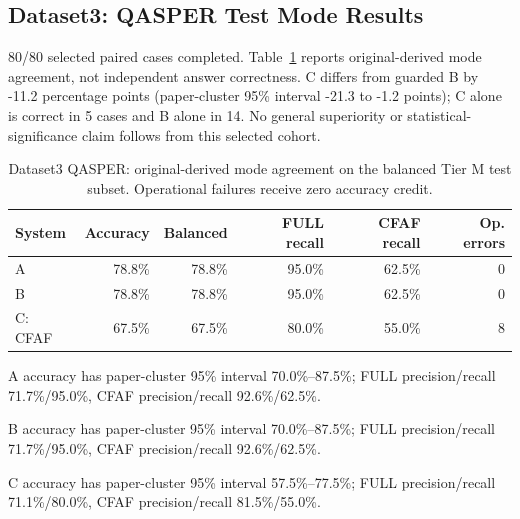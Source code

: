 \subsection{Dataset3: QASPER Test Mode Results}

80/80 selected paired cases completed. Table~\ref{tab:qasper-test-modes} reports original-derived mode agreement, not independent answer correctness. C differs from guarded B by -11.2 percentage points (paper-cluster 95\% interval -21.3 to -1.2 points); C alone is correct in 5 cases and B alone in 14. No general superiority or statistical-significance claim follows from this selected cohort.

\begin{table}[H]

\centering\small

\caption{Dataset3 QASPER: original-derived mode agreement on the balanced Tier M test subset. Operational failures receive zero accuracy credit.}

\label{tab:qasper-test-modes}

\begin{tabular}{lrrrrr}

\toprule

System & Accuracy & Balanced & FULL recall & CFAF recall & Op. errors \\

\midrule

A & 78.8\% & 78.8\% & 95.0\% & 62.5\% & 0 \\

B & 78.8\% & 78.8\% & 95.0\% & 62.5\% & 0 \\

C: CFAF & 67.5\% & 67.5\% & 80.0\% & 55.0\% & 8 \\

\bottomrule

\end{tabular}

\end{table}

A accuracy has paper-cluster 95\% interval 70.0\%--87.5\%; FULL precision/recall 71.7\%/95.0\%, CFAF precision/recall 92.6\%/62.5\%.

B accuracy has paper-cluster 95\% interval 70.0\%--87.5\%; FULL precision/recall 71.7\%/95.0\%, CFAF precision/recall 92.6\%/62.5\%.

C accuracy has paper-cluster 95\% interval 57.5\%--77.5\%; FULL precision/recall 71.1\%/80.0\%, CFAF precision/recall 81.5\%/55.0\%.

